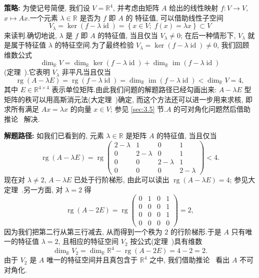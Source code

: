 \noindent\textbf{策略:} 为使记号简便, 我们设 $V = \mathbb{R}^4$, 并考虑由矩阵 $A$ 给出的线性映射
$f \colon V \longrightarrow V$, $x \longmapsto Ax$.一个元素 $\lambda \in \mathbb{R}$ 是否为 $f$ 即 $A$ 的
特征值, 可以借助线性子空间
\[
V_\lambda = \ker(f - \lambda \operatorname{id}) = \left\{x \in V;\; f(x) = \lambda x\right\} \subset V
\]
来读判.确切地说, $\lambda$ 是 $f$ 即 $A$ 的特征值, 当且仅当 $V_\lambda \neq 0$; 在后一种情形下,
$V_\lambda$ 就是属于特征值 $\lambda$ 的特征空间.为了最终检验
$V_\lambda = \ker(f - \lambda \operatorname{id}) \neq 0$, 我们回顾维数公式
\[
\dim_{\mathbb{R}} V = \dim_{\mathbb{R}} \ker(f - \lambda \operatorname{id}) + \dim_{\mathbb{R}} \operatorname{im}(f - \lambda \operatorname{id})
\]
(定理~).它表明 $V_\lambda$ 非平凡当且仅当
\[
\operatorname{rg}(A - \lambda E) = \operatorname{rg}(f - \lambda \operatorname{id}) = \dim_{\mathbb{R}} \operatorname{im}(f - \lambda \operatorname{id}) < \dim_{\mathbb{R}} V = 4,
\]
其中 $E \in \mathbb{R}^{4 \times 4}$ 表示单位矩阵.由此我们问题的解题路径已经勾画出来:
$A - \lambda E$ 型矩阵的秩可以用高斯消元法(大定理~)确定, 而这个方法还可以进一步用来求核, 即求所有满足 $Ax = \lambda x$ 的向量 $x \in V$; 参见 \ref{sec:3.5} 节.$A$ 的可对角化问题然后借助推论~ 解决.

\noindent\textbf{解题路径:} 如我们已看到的, 元素 $\lambda \in \mathbb{R}$ 是矩阵 $A$ 的特征值, 当且仅当
\[
\operatorname{rg}(A - \lambda E) = \operatorname{rg} \begin{pmatrix}
2 - \lambda & 1 & 0 & 1 \\
0 & 2 - \lambda & 0 & 1 \\
0 & 0 & 2 - \lambda & 1 \\
0 & 0 & 0 & 2 - \lambda
\end{pmatrix} < 4\text{.}
\]
现在对 $\lambda \neq 2$, $A - \lambda E$ 已处于行阶梯形, 由此可以读出 $\operatorname{rg}(A - \lambda E) = 4$; 参见大定理~.另一方面, 对 $\lambda = 2$ 得
\[
\operatorname{rg}(A - 2E) = \operatorname{rg} \begin{pmatrix}
0 & 1 & 0 & 1 \\
0 & 0 & 0 & 1 \\
0 & 0 & 0 & 1 \\
0 & 0 & 0 & 0
\end{pmatrix} = 2,
\]
因为我们把第二行从第三行减去, 从而得到一个秩为 $2$ 的行阶梯形.于是 $A$ 只有唯一的特征值 $\lambda = 2$, 且相应的特征空间 $V_2$ 按公式(定理~)具有维数
\[
\dim_{\mathbb{R}} V_2 = \dim_{\mathbb{R}} \mathbb{R}^4 - \operatorname{rg}(A - 2E) = 4 - 2 = 2\text{.}
\]
由于 $V_2$ 是 $A$ 唯一的特征空间并且真包含于 $\mathbb{R}^4$ 之中, 我们借助推论~ 看出 $A$ 不可对角化.

